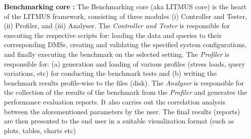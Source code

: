 \documentclass{llncs}
\newcommand{\todoiteminline}[3]{
    \todoitemtemplate{#1}{#2}{#3}{inline}{red}
}
\newcommand{\todoproofread}[3]{
    \todoitemtemplate{#1}{#2}{Please proof read above section; #3}{inline}{yellow}
}
\newcommand{\todoitemtemplate}[5]{%
\todo[#4,color=#5,caption=X]{{#1}{ \textbf{{\tiny{for}} #2}:}{#3}}%
}
\begin{document}
\begin{itemize}[nosep]
        \textbf{Benchmarking core :} The Benchmarking core (aka LITMUS core) is the heart of the LITMUS framework, consisting of three modules (i) Controller and Tester, (ii) Profiler, and (iii) Analyser. The \textit{Controller and Tester} is responsible for executing the respective scripts for: loading the data and queries to their corresponding DMSs, creating and validating the specified system configurations, and finally executing the benchmark on the selected setting. The \textit{Profiler} is responsible for: (a) generation and loading of various profiles (stress loads, query variations, etc) for conducting the benchmark tests and (b) writing the benchmark results profile-wise to the files (disk). The \textit{Analyser} is responsible for the collection of the results of the benchmark from the \textit{Profiler} and generates the performance evaluation reports. It also carries out the correlation analysis between the aforementioned  parameters by the user. The final results (reports) are then presented to the end user in a suitable visualization format (such as plots, tables, charts etc)
    
    

  
    

\end{itemize}
\end{document}
